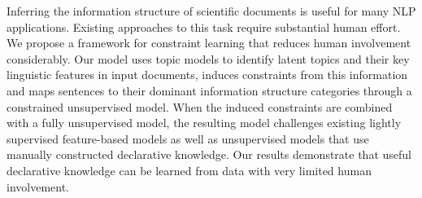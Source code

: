 Inferring the information structure of scientific documents is useful for many NLP applications. Existing approaches to this task require substantial human effort. We propose a framework for constraint learning that reduces human involvement considerably. Our model uses topic models to identify latent topics and their key linguistic features in input documents, induces constraints from this information and maps sentences to their dominant information structure categories through a constrained unsupervised model. When the induced constraints are combined with a fully unsupervised model, the resulting model challenges existing lightly supervised feature-based models as well as unsupervised models that use manually constructed declarative knowledge. Our results demonstrate that useful declarative knowledge can be learned from data with very limited human involvement.